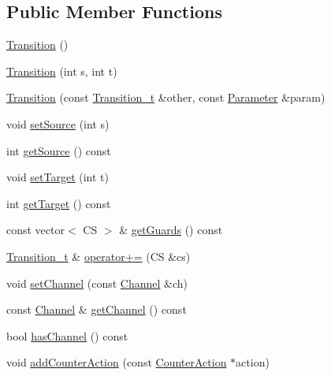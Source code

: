 \subsection*{Public Member Functions}
\begin{DoxyCompactItemize}
\item 
\mbox{\hyperlink{classgraphsat_1_1_transition_a66f3b9e8b9b5d2d941cf8daed7deb024}{Transition}} ()
\item 
\mbox{\hyperlink{classgraphsat_1_1_transition_a9e8a93ede40a53a52376f122297edf23}{Transition}} (int s, int t)
\item 
\mbox{\hyperlink{classgraphsat_1_1_transition_a6324e36409a36829cdc25b53c5ee332d}{Transition}} (const \mbox{\hyperlink{classgraphsat_1_1_transition_ae0650c39cf272493d16d1fd1b01b6075}{Transition\+\_\+t}} \&other, const \mbox{\hyperlink{classgraphsat_1_1_parameter}{Parameter}} \&param)
\item 
void \mbox{\hyperlink{classgraphsat_1_1_transition_a72ba2eeb745e6d72761cfbeb01135d3b}{set\+Source}} (int s)
\item 
int \mbox{\hyperlink{classgraphsat_1_1_transition_ac6db9fd2e60156e536f48bef36973875}{get\+Source}} () const
\item 
void \mbox{\hyperlink{classgraphsat_1_1_transition_a8e5c7d83133796e972dec30b2710505e}{set\+Target}} (int t)
\item 
int \mbox{\hyperlink{classgraphsat_1_1_transition_a52fb0f8200812119b8cec7164244a09c}{get\+Target}} () const
\item 
const vector$<$ CS $>$ \& \mbox{\hyperlink{classgraphsat_1_1_transition_a0dd4175fcf8cae99fbac4b00aa5cc9d1}{get\+Guards}} () const
\item 
\mbox{\hyperlink{classgraphsat_1_1_transition_ae0650c39cf272493d16d1fd1b01b6075}{Transition\+\_\+t}} \& \mbox{\hyperlink{classgraphsat_1_1_transition_ad160a39fd0ab1f2341525d9d8540802f}{operator+=}} (CS \&cs)
\item 
void \mbox{\hyperlink{classgraphsat_1_1_transition_a5d5733c7945e86a2c1e4a42bacdd791a}{set\+Channel}} (const \mbox{\hyperlink{structgraphsat_1_1_channel}{Channel}} \&ch)
\item 
const \mbox{\hyperlink{structgraphsat_1_1_channel}{Channel}} \& \mbox{\hyperlink{classgraphsat_1_1_transition_a22fa6286cb88f0aaf08c15ea8670ebe5}{get\+Channel}} () const
\item 
bool \mbox{\hyperlink{classgraphsat_1_1_transition_ac06144ef0f67caf014ee061d4969c787}{has\+Channel}} () const
\item 
void \mbox{\hyperlink{classgraphsat_1_1_transition_a8b25340523019a7995e5d77b112bf37f}{add\+Counter\+Action}} (const \mbox{\hyperlink{classgraphsat_1_1_counter_action}{Counter\+Action}} $\ast$action)

\end{DoxyCompactItemize}
